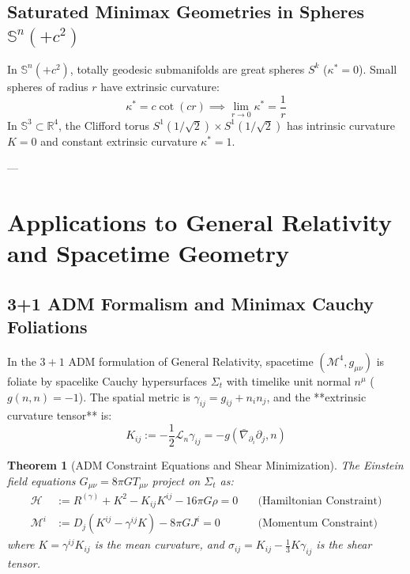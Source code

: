 \documentclass[11pt,reqno]{amsart}
\newtheorem{theorem}{Theorem}[section]
\theoremstyle{definition}
\providecommand{\R}{\mathbb{R}}
\providecommand{\Sph}{\mathbb{S}}
\numberwithin{equation}{section}
\providecommand{\Sph}{\mathbb{S}}
\providecommand{\R}{\mathbb{R}}
\begin{document}
\subsection{Saturated Minimax Geometries in Spheres \texorpdfstring{$\Sph^n(+c^2)$}{S\textasciicircum n(+c\textasciicircum 2)}}
In $\Sph^n(+c^2)$, totally geodesic submanifolds are great spheres $S^k$ ($\kappa^* = 0$). Small spheres of radius $r$ have extrinsic curvature:
\begin{equation}
\kappa^* = c \cot(c r) \implies \lim_{r \to 0} \kappa^* = \frac{1}{r}
\end{equation}
In $\Sph^3 \subset \R^4$, the Clifford torus $S^1(1/\sqrt{2}) \times S^1(1/\sqrt{2})$ has intrinsic curvature $K = 0$ and constant extrinsic curvature $\kappa^* = 1$.

---

\section{Applications to General Relativity and Spacetime Geometry}

\subsection{3+1 ADM Formalism and Minimax Cauchy Foliations}
In the $3+1$ ADM formulation of General Relativity, spacetime $(\mathcal{M}^4, g_{\mu\nu})$ is foliate by spacelike Cauchy hypersurfaces $\Sigma_t$ with timelike unit normal $n^\mu$ ($g(n, n) = -1$).
The spatial metric is $\gamma_{ij} = g_{ij} + n_i n_j$, and the **extrinsic curvature tensor** is:
\begin{equation}
K_{ij} := -\frac{1}{2} \mathcal{L}_n \gamma_{ij} = -g(\bar{\nabla}_{\partial_i} \partial_j, n)
\end{equation}

\begin{theorem}[ADM Constraint Equations and Shear Minimization]
The Einstein field equations $G_{\mu\nu} = 8\pi G T_{\mu\nu}$ project on $\Sigma_t$ as:
\begin{align}
\label{eq:hamiltonian_constraint}
\mathcal{H} &:= R^{(\gamma)} + K^2 - K_{ij}K^{ij} - 16\pi G \rho = 0 \quad &\text{(Hamiltonian Constraint)} \\
\label{eq:momentum_constraint}
\mathcal{M}^i &:= D_j (K^{ij} - \gamma^{ij} K) - 8\pi G J^i = 0 \quad &\text{(Momentum Constraint)}
\end{align}
where $K = \gamma^{ij} K_{ij}$ is the mean curvature, and $\sigma_{ij} = K_{ij} - \frac{1}{3} K \gamma_{ij}$ is the shear tensor.
\end{theorem}
\end{document}
